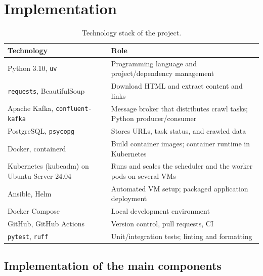 \newpage
\section{Implementation}

\begin{table}[H]
\centering
\begin{tabular}{|p{4.6cm}|p{9.0cm}|}
\hline
\textbf{Technology} & \textbf{Role} \\
\hline
Python 3.10, \texttt{uv} & Programming language and project/dependency management \\
\hline
\texttt{requests}, BeautifulSoup & Download HTML and extract content and links \\
\hline
Apache Kafka, \texttt{confluent-kafka} & Message broker that distributes crawl tasks; Python producer/consumer \\
\hline
PostgreSQL, \texttt{psycopg} & Stores URLs, task status, and crawled data \\
\hline
Docker, containerd & Build container images; container runtime in Kubernetes \\
\hline
Kubernetes (kubeadm) on Ubuntu Server 24.04 & Runs and scales the scheduler and the worker pods on several VMs \\
\hline
Ansible, Helm & Automated VM setup; packaged application deployment \\
\hline
Docker Compose & Local development environment \\
\hline
GitHub, GitHub Actions & Version control, pull requests, CI \\
\hline
\texttt{pytest}, \texttt{ruff} & Unit/integration tests; linting and formatting \\
\hline
\end{tabular}
\caption{Technology stack of the project.}
\label{tab:stack}
\end{table}





\subsection{Implementation of the main components}




